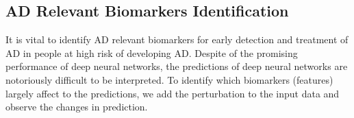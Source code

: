 \subsection{AD Relevant Biomarkers Identification}
It is vital to identify AD relevant biomarkers for early detection and treatment of AD in people at high risk of developing AD. Despite of the promising performance of deep neural networks, the predictions of deep neural networks are notoriously difficult to be interpreted. To identify which biomarkers (features) largely affect to the predictions, we add the perturbation to the input data and observe the changes in prediction.

